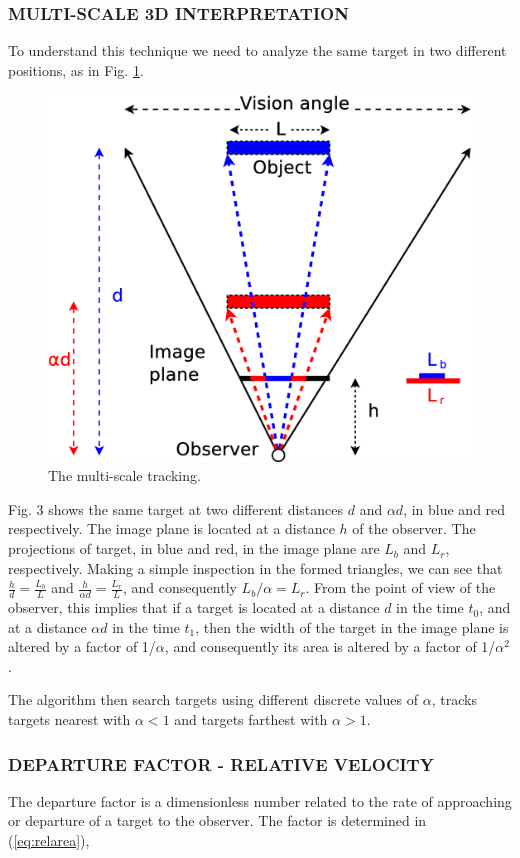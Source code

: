 \subsubsection{MULTI-SCALE 3D INTERPRETATION}
To understand this technique we need to analyze the same target in 
two different positions, as in Fig. \ref{fig:multiscale3d}.

\begin{figure}[H]
\centering
  \includegraphics[width=.7\columnwidth]{images/Diagrama3.eps}
  \caption{The multi-scale tracking.}
  \label{fig:multiscale3d}
\end{figure}
Fig. 3 shows the same target at two different distances $d$ and $\alpha d$, in blue and red respectively.
The image plane is located at a distance $h$ of the observer.
The projections of target, in blue and red, in the image plane are
$L_b$ and $L_r$, respectively. Making a simple inspection in the
formed triangles, we can see that $\frac{h}{d}=\frac{L_b}{L}$ and 
$\frac{h}{\alpha d}=\frac{L_r}{L}$, and consequently $L_b/\alpha= L_r$. 
From the point of view of the observer, this implies that if a target 
is located at a distance $d$ in the time $t_0$,  and at a distance $\alpha d$ in the time $t_1$, 
then the width of the target in the image plane is altered by a factor of 1/$\alpha$, 
and consequently its area is altered by a factor of 1/$\alpha^2$.

The algorithm then search targets using different discrete values of $\alpha$,
tracks targets nearest with $\alpha<1$ and targets farthest with $\alpha>1$.


\subsubsection{DEPARTURE FACTOR - RELATIVE VELOCITY}
The departure factor is a dimensionless number related to the rate of approaching 
or departure of a target to the observer. The factor
is determined in (\ref{eq:relarea}),

